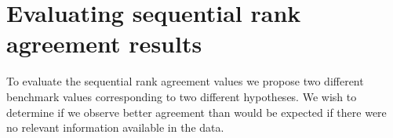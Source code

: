 \documentclass[oupdraft]{bio}
\begin{document}








\section{Evaluating sequential rank agreement results}
To evaluate the sequential rank agreement values we propose two
different benchmark values corresponding to two different
hypotheses. We wish to determine if we observe better agreement than
would be expected if there were no relevant information available in
the data.
\end{document}
